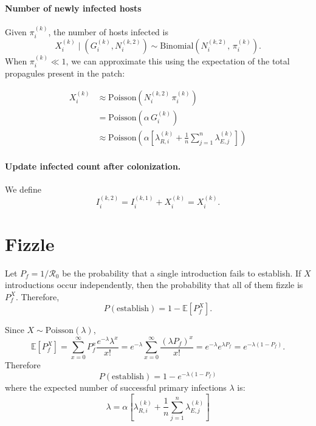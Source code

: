 \documentclass[12pt]{article}
\begin{document}
\paragraph{Number of newly infected hosts}
Given $\pi_i^{(k)}$, the number of hosts infected is
\[
X_i^{(k)} \mid \left(G_i^{(k)},N_i^{(k,2)}\right) \sim \mathrm{Binomial}\!\left(N_i^{(k,2)},\,\pi_i^{(k)}\right).
\]
When $\pi_i^{(k)}\ll 1$, we can approximate this using the expectation of the total propagules present in the patch:

\begin{equation}
\begin{aligned}
X_i^{(k)} 
&\approx \mathrm{Poisson}\!\left(N_i^{(k,2)}\,\pi_i^{(k)}\right) \\
&= \mathrm{Poisson}\!\left(\alpha\,G_i^{(k)}\right) \\
&\approx \mathrm{Poisson}\!\left( \alpha \left[ \lambda_{R,i}^{(k)} + \frac{1}{n}\sum_{j=1}^n \lambda_{E,j}^{(k)} \right] \right)
\end{aligned}
\label{eq:X_poisson_approx}
\end{equation}

\paragraph{Update infected count after colonization.}
We define
\begin{equation}
I_i^{(k,2)} = I_i^{(k,1)} + X_i^{(k)} = X_i^{(k)}.
\end{equation}

\section{Fizzle}

Let $P_f=1/\mathcal{R}_0$ be the probability that a single introduction fails to establish.
If $X$ introductions occur independently, then the probability that all of them fizzle is $P_f^X$. Therefore,
\[
P(\text{establish}) = 1-\mathbb{E}[P_f^X].
\]

Since $X\sim \mathrm{Poisson}(\lambda)$, 
\[
\mathbb{E}[P_f^X]
= \sum_{x=0}^{\infty} P_f^x \frac{e^{-\lambda}\lambda^x}{x!}
= e^{-\lambda} \sum_{x=0}^{\infty}\frac{(\lambda P_f)^x}{x!}
= e^{-\lambda} e^{\lambda P_f}
= e^{-\lambda(1-P_f)}.
\]
Therefore
\[
P(\text{establish}) = 1-e^{-\lambda(1-P_f)}
\]
where the expected number of successful primary infections $\lambda$ is:
\[
\lambda = \alpha \left[ \lambda_{R,i}^{(k)} + \frac{1}{n}\sum_{j=1}^n \lambda_{E,j}^{(k)} \right]
\]
\end{document}
